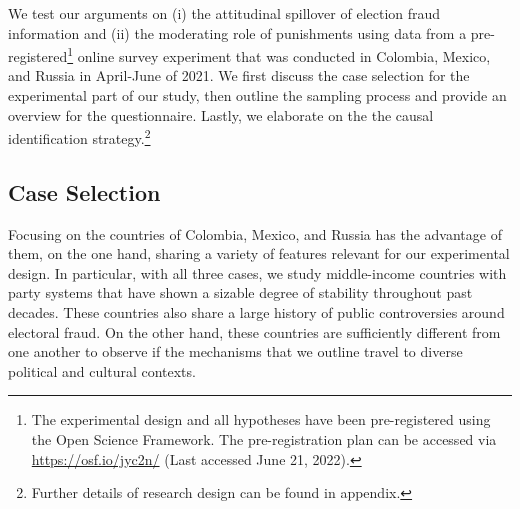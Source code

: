 \documentclass[11pt, ngerman,english,a4]{article}
\begin{document}
 
We test our arguments on (i) the attitudinal spillover of election fraud information and (ii) the moderating role of punishments using data from a pre-registered\footnote{The experimental design and all hypotheses have been pre-registered using the Open Science Framework. The pre-registration plan can be accessed via \url{https://osf.io/jyc2n/} (Last accessed June 21, 2022).} online survey experiment that was conducted in Colombia, Mexico, and Russia in April-June of 2021. We first discuss the case selection for the experimental part of our study, then outline the sampling process and provide an overview for the questionnaire. Lastly, we elaborate on the the causal identification strategy.\footnote{Further details of research design can be found in appendix.}


\subsection*{Case Selection}

Focusing on the countries of Colombia, Mexico, and Russia has the advantage of them, on the one hand, sharing a variety of features relevant for our experimental design. In particular, with all three cases, we study middle-income countries with party systems that have shown a sizable degree of stability throughout past decades. These countries also share a large history of public controversies around electoral fraud. On the other hand, these countries are sufficiently different from one another to observe if the mechanisms that we outline travel to diverse political and cultural contexts. 
\end{document}
